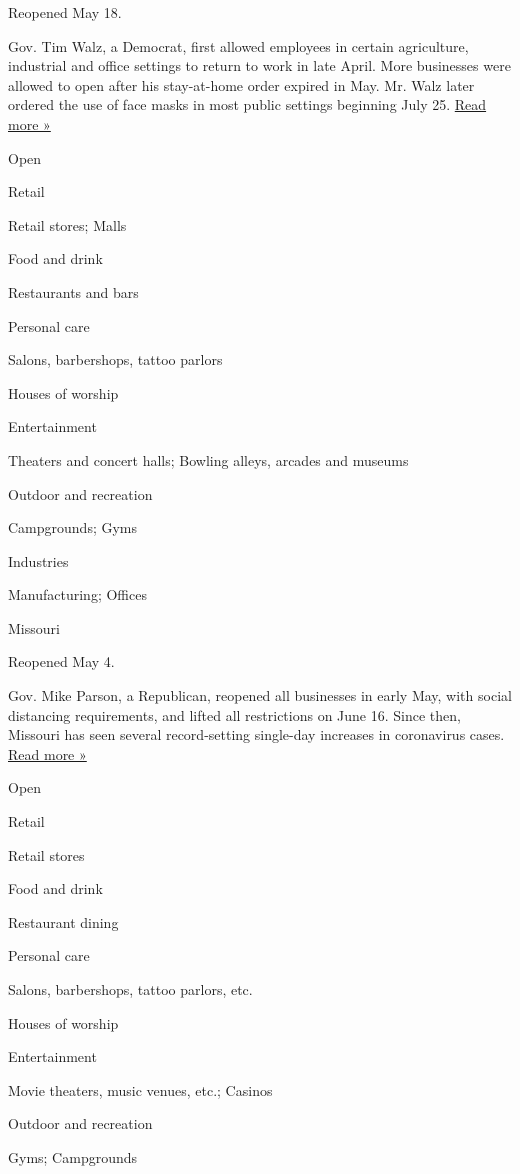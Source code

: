 Reopened May 18.

Gov. Tim Walz, a Democrat, first allowed employees in certain
agriculture, industrial and office settings to return to work in late
April. More businesses were allowed to open after his stay-at-home order
expired in May. Mr. Walz later ordered the use of face masks in most
public settings beginning July 25.
\href{https://www.startribune.com/walz-mandates-masks-indoors-across-state/571861471/}{Read
more »}

Open

Retail

Retail stores; Malls

Food and drink

Restaurants and bars

Personal care

Salons, barbershops, tattoo parlors

Houses of worship

Entertainment

Theaters and concert halls; Bowling alleys, arcades and museums

Outdoor and recreation

Campgrounds; Gyms

Industries

Manufacturing; Offices

Missouri

Reopened May 4.

Gov. Mike Parson, a Republican, reopened all businesses in early May,
with social distancing requirements, and lifted all restrictions on June
16. Since then, Missouri has seen several record-setting single-day
increases in coronavirus cases.
\href{https://abcnews.go.com/US/missouri-health-officials-call-aggressive-actions-covid-19/story?id=71998723}{Read
more »}

Open

Retail

Retail stores

Food and drink

Restaurant dining

Personal care

Salons, barbershops, tattoo parlors, etc.

Houses of worship

Entertainment

Movie theaters, music venues, etc.; Casinos

Outdoor and recreation

Gyms; Campgrounds

